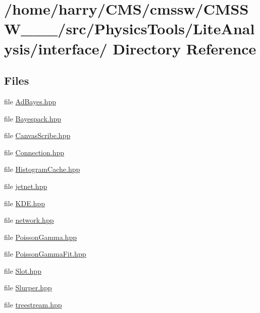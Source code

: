 \hypertarget{dir_000000}{
\section{/home/harry/CMS/cmssw/CMSSW\_\_\_/src/Physics\-Tools/Lite\-Analysis/interface/ Directory Reference}
\label{dir_000000}
}


\subsection*{Files}
\begin{CompactItemize}
\item 
file \hyperlink{AdBayes_8hpp}{Ad\-Bayes.hpp}
\item 
file \hyperlink{Bayespack_8hpp}{Bayespack.hpp}
\item 
file \hyperlink{CanvasScribe_8hpp}{Canvas\-Scribe.hpp}
\item 
file \hyperlink{Connection_8hpp}{Connection.hpp}
\item 
file \hyperlink{HistogramCache_8hpp}{Histogram\-Cache.hpp}
\item 
file \hyperlink{jetnet_8hpp}{jetnet.hpp}
\item 
file \hyperlink{KDE_8hpp}{KDE.hpp}
\item 
file \hyperlink{network_8hpp}{network.hpp}
\item 
file \hyperlink{PoissonGamma_8hpp}{Poisson\-Gamma.hpp}
\item 
file \hyperlink{PoissonGammaFit_8hpp}{Poisson\-Gamma\-Fit.hpp}
\item 
file \hyperlink{Slot_8hpp}{Slot.hpp}
\item 
file \hyperlink{Slurper_8hpp}{Slurper.hpp}
\item 
file \hyperlink{treestream_8hpp}{treestream.hpp}
\end{CompactItemize}
